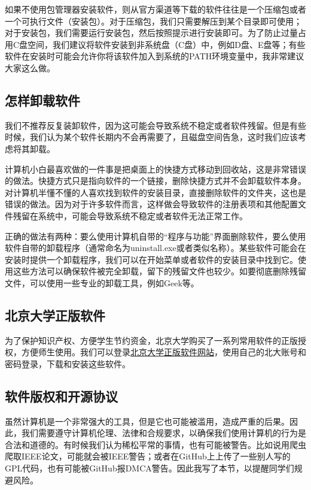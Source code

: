 如果不使用包管理器安装软件，则从官方渠道等下载的软件往往是一个压缩包或者一个可执行文件（安装包）。对于压缩包，我们只需要解压到某个目录即可使用；对于安装包，我们需要运行安装包，然后按照提示进行安装即可。为了防止过量占用C盘空间，我们建议将软件安装到非系统盘（C盘）中，例如D盘、E盘等；有些软件在安装时可能会允许你将该软件加入到系统的PATH环境变量中，我非常建议大家这么做。

\subsection{怎样卸载软件}

我们不推荐反复装卸软件，因为这可能会导致系统不稳定或者软件残留。但是有些时候，我们认为某个软件长期内不会再需要了，且磁盘空间告急，这时我们应该考虑将其卸载。

计算机小白最喜欢做的一件事是把桌面上的快捷方式移动到回收站，这是非常错误的做法。快捷方式只是指向软件的一个链接，删除快捷方式并不会卸载软件本身。对计算机半懂不懂的人喜欢找到软件的安装目录，直接删除软件的文件夹，这也是错误的做法。因为对于许多软件而言，这样做会导致软件的注册表项和其他配置文件残留在系统中，可能会导致系统不稳定或者软件无法正常工作。

正确的做法有两种：要么使用计算机自带的“程序与功能”界面删除软件，要么使用软件自带的卸载程序（通常命名为uninstall.exe或者类似名称）。某些软件可能会在安装时提供一个卸载程序，我们可以在开始菜单或者软件的安装目录中找到它。使用这些方法可以确保软件被完全卸载，留下的残留文件也较少。如要彻底删除残留文件，可以使用一些专业的卸载工具，例如Geek等。

\subsection{北京大学正版软件}

为了保护知识产权、方便学生节约资金，北京大学购买了一系列常用软件的正版授权，方便师生使用。我们可以登录\href{https://software.pku.edu.cn/}{北京大学正版软件网站}，使用自己的北大账号和密码登录，下载和安装这些软件。

\subsection{软件版权和开源协议}

虽然计算机是一个非常强大的工具，但是它也可能被滥用，造成严重的后果。因此，我们需要遵守计算机伦理、法律和合规要求，以确保我们使用计算机的行为是合法和道德的。有时候我们认为稀松平常的事情，也有可能被警告。比如说用爬虫爬取IEEE论文，可能就会被IEEE警告；或者在GitHub上上传了一些别人写的GPL代码，也有可能被GitHub报DMCA警告。因此我写了本节，以提醒同学们规避风险。

